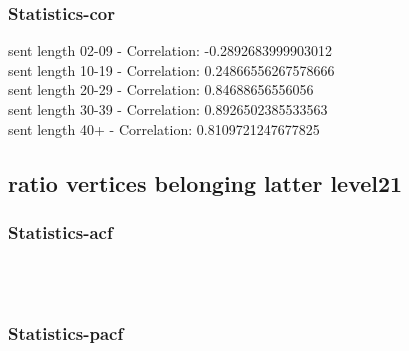 \documentclass{article}%
\begin{document}
%
\newpage%
\subsubsection{Statistics{-}cor}%
\label{ssubsec:Statistics{-}cor}%
\noindent%
sent length 02-09 - Correlation: -0.2892683999903012\\%
sent length 10-19 - Correlation: 0.24866556267578666\\%
sent length 20-29 - Correlation: 0.84688656556056\\%
sent length 30-39 - Correlation: 0.8926502385533563\\%
sent length 40+ - Correlation: 0.8109721247677825\\

%
\newpage

%
\subsection{ratio vertices belonging latter level21}%
\label{subsec:ratioverticesbelonginglatterlevel21}%
\subsubsection{Statistics{-}acf}%
\label{ssubsec:Statistics{-}acf}%


\begin{figure}[ht]%
\centering%
\setlength{\abovecaptionskip}{-35pt}%
%
%
\\%
%
%
\\%
%
\end{figure}

%
\newpage%
\subsubsection{Statistics{-}pacf}%
\label{ssubsec:Statistics{-}pacf}%
\end{document}
